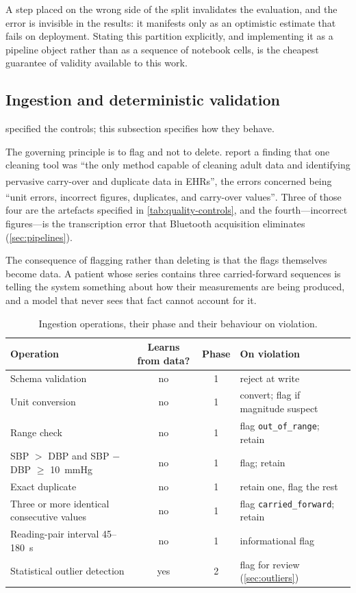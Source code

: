 \documentclass[12pt,a4paper,oneside]{report}
\newcommand{\bq}[1]{``#1''\textsuperscript{\dag}}
\begin{document}
A step placed on the wrong side of the split invalidates the evaluation, and the error is invisible in the results: it manifests only as an optimistic estimate that fails on deployment. Stating this partition explicitly, and implementing it as a pipeline object rather than as a sequence of notebook cells, is the cheapest guarantee of validity available to this work.

\subsection{Ingestion and deterministic validation}\label{sec:ingestion}

 specified the controls; this subsection specifies how they behave.

The governing principle is to flag and not to delete. \Textcite{liu2025review} report a finding that one cleaning tool was \bq{the only method capable of cleaning adult data and identifying pervasive carry-over and duplicate data in EHRs}, the errors concerned being \bq{unit errors, incorrect figures, duplicates, and carry-over values}. Three of those four are the artefacts specified in \cref{tab:quality-controls}, and the fourth---incorrect figures---is the transcription error that Bluetooth acquisition eliminates (\cref{sec:pipelines}).

The consequence of flagging rather than deleting is that the flags themselves become data. A patient whose series contains three carried-forward sequences is telling the system something about how their measurements are being produced, and a model that never sees that fact cannot account for it.

\begin{table}[htbp]
\centering\footnotesize
\caption{Ingestion operations, their phase and their behaviour on violation.}\label{tab:ingestion-ops}
\begin{tabularx}{\textwidth}{@{}X c c >{\raggedright\arraybackslash}p{4.0cm}@{}}
\toprule
\textbf{Operation} & \textbf{Learns from data?} & \textbf{Phase} & \textbf{On violation} \\
\midrule
Schema validation & no & 1 & reject at write \\
Unit conversion & no & 1 & convert; flag if magnitude suspect \\
Range check & no & 1 & flag \texttt{out\_of\_range}; retain \\
SBP $>$ DBP and SBP $-$ DBP $\geq$ 10~mmHg & no & 1 & flag; retain \\
Exact duplicate & no & 1 & retain one, flag the rest \\
Three or more identical consecutive values & no & 1 & flag \texttt{carried\_forward}; retain \\
Reading-pair interval 45--180~s & no & 1 & informational flag \\
Statistical outlier detection & yes & 2 & flag for review (\cref{sec:outliers}) \\
\bottomrule
\end{tabularx}
\end{table}
\end{document}
